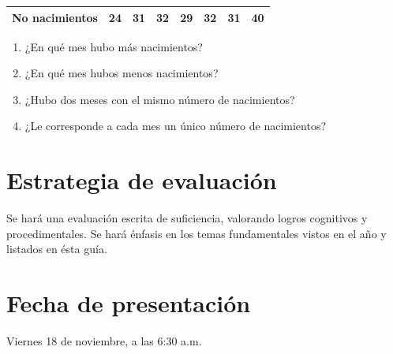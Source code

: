 \documentclass[letterpaper,11pt,twoside]{article}
\begin{document}
\begin{enumerate}
\begin{center}
\begin{tabular}{|c|c|c|c|c|c|c|c|}
\hline 
No nacimientos & 24 & 31 & 32 & 29 & 32 & 31 & 40 \\ 
\hline 
\end{tabular} 
\end{center}
\begin{enumerate}
\item ¿En qué mes hubo más nacimientos?
\item ¿En qué mes hubos menos nacimientos?
\item ¿Hubo dos meses con el mismo número de nacimientos?
\item ¿Le corresponde a cada mes un único número de nacimientos?
\end{enumerate}
\end{enumerate}
\section*{Estrategia de evaluación}
Se hará una evaluación escrita de suficiencia, valorando logros cognitivos y procedimentales. Se hará énfasis en los temas fundamentales vistos en el año y listados en ésta guía.
\section*{Fecha de presentación}
Viernes 18 de noviembre, a las 6:30 a.m.
\end{document}
